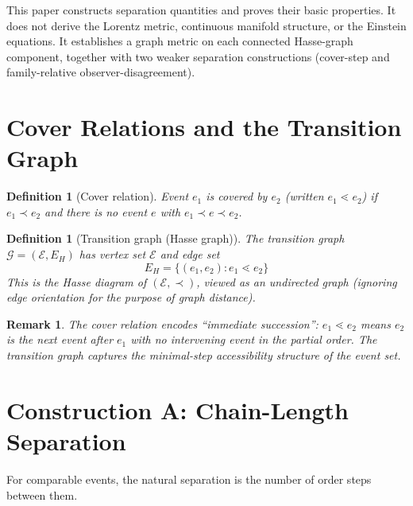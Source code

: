 \documentclass[12pt]{article}
\newtheorem{definition}[theorem]{Definition}
\newtheorem{remark}[theorem]{Remark}
\newcommand{\Ecal}{\mathcal{E}}
\newcommand{\Gcal}{\mathcal{G}}
\begin{document}
This paper constructs separation quantities and proves their basic properties. It does not derive the Lorentz metric, continuous manifold structure, or the Einstein equations. It establishes a graph metric on each connected Hasse-graph component, together with two weaker separation constructions (cover-step and family-relative observer-disagreement).

\section{Cover Relations and the Transition Graph}\label{sec:hasse}

\begin{definition}[Cover relation]\label{def:cover}
Event $e_1$ is \textit{covered by} $e_2$ (written $e_1 \lessdot e_2$) if $e_1 \prec e_2$ and there is no event $e$ with $e_1 \prec e \prec e_2$.
\end{definition}

\begin{definition}[Transition graph (Hasse graph)]\label{def:hasse}
The \textit{transition graph} $\Gcal = (\Ecal, E_H)$ has vertex set $\Ecal$ and edge set
\begin{equation}
    E_H = \{(e_1, e_2) : e_1 \lessdot e_2\}
\end{equation}
This is the Hasse diagram of $(\Ecal, \prec)$, viewed as an undirected graph (ignoring edge orientation for the purpose of graph distance).
\end{definition}

\begin{remark}
The cover relation encodes ``immediate succession'': $e_1 \lessdot e_2$ means $e_2$ is the next event after $e_1$ with no intervening event in the partial order. The transition graph captures the minimal-step accessibility structure of the event set.
\end{remark}

\section{Construction A: Chain-Length Separation}\label{sec:chain}

For comparable events, the natural separation is the number of order steps between them.
\end{document}

